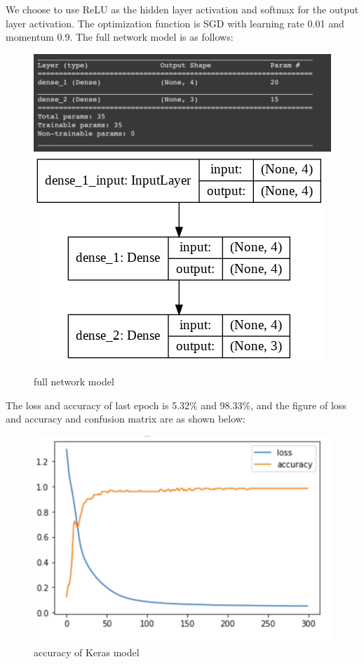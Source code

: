 \documentclass{article}
\begin{document}
We choose to use ReLU as the hidden layer activation and softmax for the output layer activation. The optimization function is SGD with learning rate 0.01 and momentum 0.9. The full network model is as follows:
\begin{figure}[H]
	\centering
	\includegraphics[scale=0.2]{./img/model.png}
	\includegraphics[scale=0.3]{./img/model_plot.png}
	\caption{full network model}
\end{figure}
\noindent
The loss and accuracy of last epoch is 5.32\% and 98.33\%, and the figure of loss and accuracy and confusion matrix are as shown below:

\begin{figure}[H]
\centering
\includegraphics[scale=0.5]{./img/accuracy.png}
\caption{accuracy of Keras model}
\end{figure}
\end{document}
